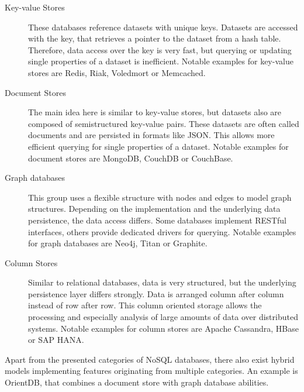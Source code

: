 \begin{description}
\item [Key-value Stores] These databases reference datasets with unique keys. Datasets are accessed with the key, that retrieves a pointer to the dataset from a hash table. Therefore, data access over the key is very fast, but querying or updating single properties of a dataset is inefficient. Notable examples for key-value stores are Redis, Riak, Voledmort or Memcached.
\item [Document Stores] The main idea here is similar to key-value stores, but datasets also are composed of semistructured key-value pairs. These datasets are often called documents and are persisted in formats like JSON. This allows more efficient querying for single properties of a dataset. Notable examples for document stores are MongoDB, CouchDB or CouchBase.
\item [Graph databases] This group uses a flexible structure with nodes and edges to model graph structures. Depending on the implementation and the underlying data persistence, the data access differs. Some databases implement RESTful interfaces, others provide dedicated drivers for querying. Notable examples for graph databases are Neo4j, Titan or Graphite.
\item [Column Stores] Similar to relational databases, data is very structured, but the underlying persistence layer differs strongly. Data is arranged column after column instead of row after row. This column oriented storage allows the processing and especially analysis of large amounts of data over distributed systems. Notable examples for column stores are Apache Cassandra, HBase or SAP HANA.
\end{description}

Apart from the presented categories of NoSQL databases, there also exist hybrid models implementing features originating from multiple categories. An example is OrientDB, that combines a document store with graph database abilities. 

